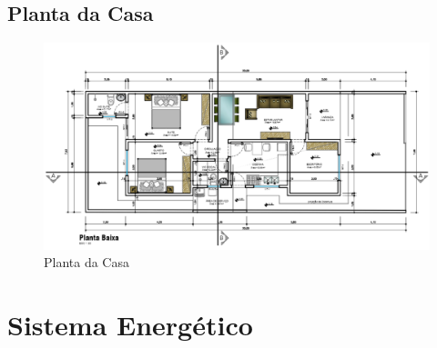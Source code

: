 	   \subsection{Planta da Casa}
        \graphicspath{ {figuras/} }
        \begin{figure}[h]
            \centering
            \includegraphics[scale=0.5]{planta}
            \caption{Planta da Casa}
            \label{fig:planta}
        \end{figure}
	        
	   \section{Sistema Energético}
